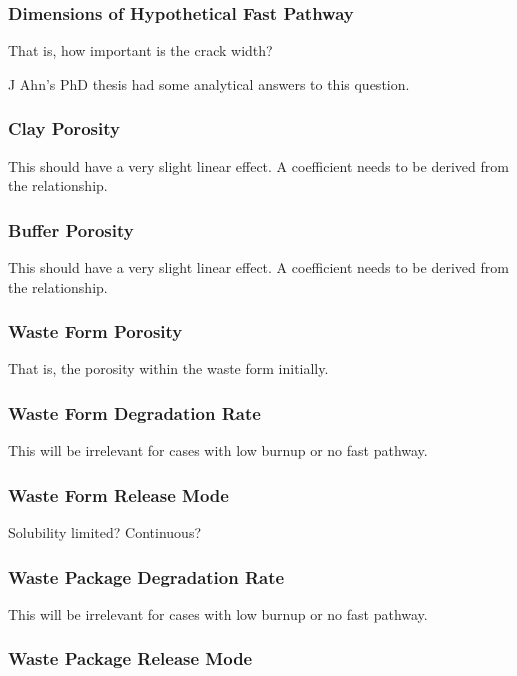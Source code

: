 \subsubsection{Dimensions of Hypothetical Fast Pathway}

That is, how important is the crack width?

J Ahn's PhD  thesis had some analytical answers to this question.

\subsubsection{Clay Porosity}

This should have a very slight linear effect. A coefficient needs to be derived 
from the relationship.

\subsubsection{Buffer Porosity}

This should have a very slight linear effect. A coefficient needs to be derived 
from the relationship.

\subsubsection{Waste Form Porosity}

That is, the porosity within the waste form initially.

\subsubsection{Waste Form Degradation Rate}

This will be irrelevant for cases with low burnup or no fast pathway. 

\subsubsection{Waste Form Release Mode}

Solubility limited? Continuous?

\subsubsection{Waste Package Degradation Rate}

This will be irrelevant for cases with low burnup or no fast pathway. 

\subsubsection{Waste Package Release Mode}

